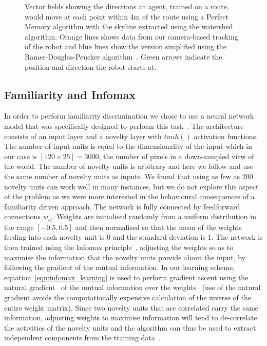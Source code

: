 \documentclass[letterpaper]{article}
\begin{document}
\begin{figure}[t]
    \caption{Vector fields showing the directions an agent, trained on a route, would move at each point within 4m of the route using a Perfect Memory algorithm with the skyline extracted using the watershed algorithm. 
    Orange lines shows data from our camera-based tracking of the robot and blue lines show the version simplified using the Ramer-Douglas-Peucker algorithm~\citep{Ramer1972}.
    Green arrows indicate the position and direction the robot starts at.}
    \label{fig:vector_fields}
\end{figure}

\subsection{Familiarity and Infomax}
\label{sec:familiarity_infomax}
In order to perform familiarity discrimination we chose to use a neural network model that was specifically designed to perform this task~\citep{Lulham2011}. 
The architecture consists of an input layer and a novelty layer with $tanh()$ activation functions. 
The number of input units is equal to the dimensionality of the input which in our case is $[120 \times 25]=3000$, the number of pixels in a down-sampled view of the world. 
The number of novelty units is arbitrary and here we follow \citet{Lulham2011} and use the same number of novelty units as inputs. 
We found that using as few as \num{200} novelty units can work well in many instances, but we do not explore this aspect of the problem as we were more interested in the behavioural consequences of a familiarity driven approach. 
The network is fully connected by feedforward connections $w_{ij}$. 
Weights are initialised randomly from a uniform distribution in the range $[-0.5,0.5]$ and then normalised so that the mean of the weights feeding into each novelty unit is \num{0} and the standard deviation is \num{1}. 
The network is then trained using the Infomax principle~\citep{Bell1995}, adjusting the weights so as to maximise the information that the novelty units provide about the input, by following the gradient of the mutual information. 
In our learning scheme, equation~\ref{eqn:infomax_learning} is used to perform gradient ascent using the natural gradient~\citep{Amari1998} of the mutual information over the weights~\citep{Lee1997} (use of the natural gradient avoids the computationally expensive calculation of the inverse of the entire weight matrix). 
Since two novelty units that are correlated carry the same information, adjusting weights to maximise information will tend to de-correlate the activities of the novelty units and the algorithm can thus be used to extract independent components from the training data~\citep{Lee1997}. 
\end{document}
